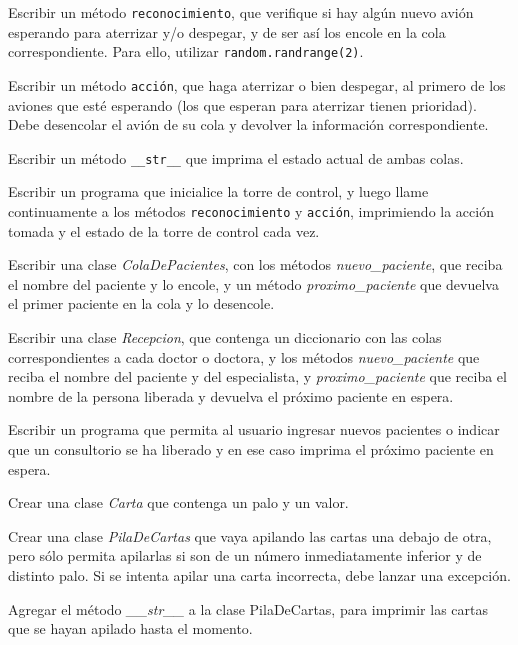 \begin{partes}
    \item Escribir un método \verb!reconocimiento!, que verifique si hay algún
nuevo avión esperando para aterrizar y/o despegar, y de ser así los encole
en la cola correspondiente. Para ello, utilizar \verb!random.randrange(2)!.
    \item Escribir un método \verb!acción!, que haga aterrizar o
bien despegar, al primero de los aviones que esté esperando (los que
esperan para aterrizar tienen prioridad). Debe desencolar el avión de su
cola y devolver la información correspondiente.
    \item Escribir un método \verb!__str__! que imprima el estado actual de
ambas colas.
    \item Escribir un programa que inicialice la torre de control, y luego llame
continuamente a los métodos \verb!reconocimiento! y \verb!acción!,
imprimiendo la acción tomada y el estado de la torre de control cada vez.
\end{partes}


\begin{partes}
    \item Escribir una clase {\it ColaDePacientes}, con los métodos {\it
nuevo\_paciente}, que reciba el nombre del paciente y lo encole, y un
método {\it proximo\_paciente} que devuelva el primer paciente en la cola y
lo desencole.
    \item Escribir una clase {\it Recepcion}, que contenga un diccionario con
las colas correspondientes a cada doctor o doctora, y los métodos {\it
nuevo\_paciente} que reciba el nombre del paciente y del especialista, y
{\it proximo\_paciente} que reciba el nombre de la persona liberada y
devuelva el próximo paciente en espera.
    \item Escribir un programa que permita al usuario ingresar nuevos pacientes
o indicar que un consultorio se ha liberado y en ese caso imprima el
próximo paciente en espera.
\end{partes}


\begin{partes}
    \item Crear una clase {\it Carta} que contenga un palo y un valor.
    \item Crear una clase {\it PilaDeCartas} que vaya apilando las cartas una
debajo de otra, pero sólo permita apilarlas si son de un número
inmediatamente inferior y de distinto palo. Si se intenta apilar una carta
incorrecta, debe lanzar una excepción.
    \item Agregar el método {\it \_\_str\_\_} a la clase PilaDeCartas, para
imprimir las cartas que se hayan apilado hasta el momento.
\end{partes}

